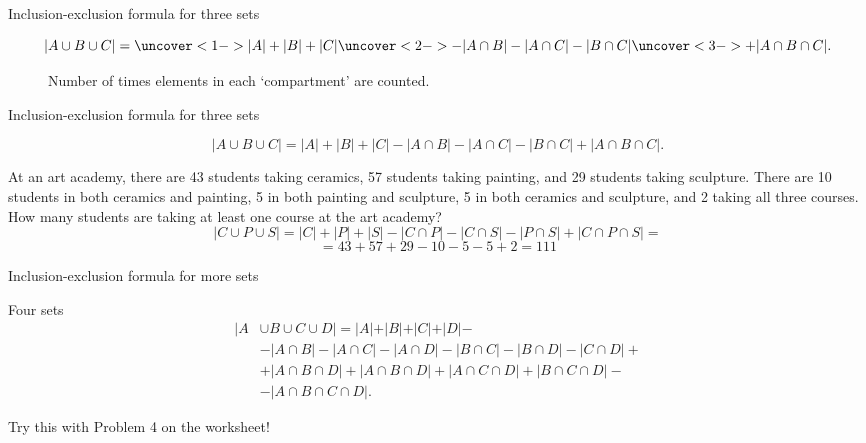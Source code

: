 \documentclass{beamer}
\def\bl[#1]#2{\begin{block}{#1}#2\end{block}}
\begin{document}
\begin{frame}{Inclusion-exclusion formula for three sets}
\bl[]{\vspace{-0.5cm}
\[
|A\cup B\cup C|=\uncover<1->{|A|+|B|+|C|}\uncover<2->{-|A\cap B|-|A\cap C|-|B\cap C|}\uncover<3->{+|A\cap B\cap C|.}
\]\vspace{-0.6cm}}
\begin{figure}
\centering
{}
\caption{Number of times elements in each `compartment' are counted.}
\end{figure}
\end{frame}

\begin{frame}{Inclusion-exclusion formula for three sets}
\bl[]{\vspace{-0.5cm}
\[
|A\cup B\cup C|=|A|+|B|+|C|-|A\cap B|-|A\cap C|-|B\cap C|+|A\cap B\cap C|.
\]}
At an art academy, there are 43 students taking ceramics, 57 students taking painting, and 29 students taking sculpture. There are 10 students in both ceramics and painting, 5 in both painting and sculpture, 5 in both ceramics and sculpture, and 2 taking all three courses. How many students are taking at least one course at the art academy?
\[
|C\cup P\cup S|=|C|+|P|+|S|-|C\cap P|-|C\cap S|-|P\cap S|+|C\cap P\cap S|=
\]
\[
=43+57+29-10-5-5+2=111
\]
\end{frame}

\begin{frame}{Inclusion-exclusion formula for more sets}
\bl[Four sets]{\vspace{-0.5cm}
\begin{align*}
|A&\cup B\cup C\cup D|=|A|+|B|+|C|+|D|-\\
&-|A\cap B|-|A\cap C|-|A\cap D|-|B\cap C|-|B\cap D|-|C\cap D|+\\
&+|A\cap B\cap D|+|A\cap B\cap D|+|A\cap C\cap D|+|B\cap C\cap D|-\\
&-|A\cap B\cap C\cap D|.
\end{align*}
}
Try this with Problem 4 on the worksheet!

\end{frame}
\end{document}
